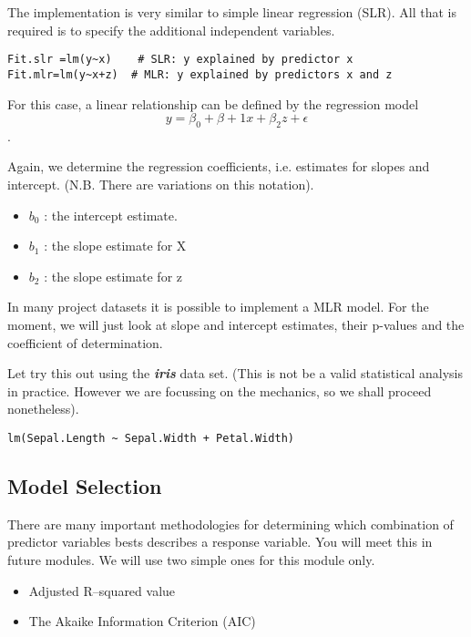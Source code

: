 \documentclass[a4paper,12pt]{article}
\begin{document}
The implementation is very similar to simple linear regression (SLR). All that is required is to specify the additional independent variables.

\begin{framed}
\begin{verbatim}
Fit.slr =lm(y~x)  	# SLR: y explained by predictor x
Fit.mlr=lm(y~x+z)  # MLR: y explained by predictors x and z
\end{verbatim}
\end{framed}

For this case, a  linear relationship can be defined by the regression model  \[y =\beta_0 + \beta+1x + \beta_2z + \epsilon\].

Again, we determine the regression coefficients, i.e. estimates for slopes and intercept. (N.B. There are variations on this notation).

\begin{itemize}
\item	$b_0$ : the intercept estimate.
\item	$b_1$  : the slope estimate for X
\item	$b_2$  : the slope estimate for z
\end{itemize}

In many project datasets it is possible to implement a MLR model. For the moment, we will just look at slope and intercept estimates, their p-values and the coefficient of determination.

Let try this out using the \textbf{\textit{iris}} data set. (This is not be a valid statistical analysis in practice. However we are focussing on the mechanics, so we shall proceed nonetheless).
\begin{framed}
\begin{verbatim}
lm(Sepal.Length ~ Sepal.Width + Petal.Width)
\end{verbatim}
\end{framed}



\subsection{Model Selection}
There are many important methodologies for determining which combination of predictor variables bests describes a response variable. You will meet this in future modules.
We will use two simple ones for this module only.
\begin{itemize}
\item Adjusted R–squared value
\item The Akaike Information Criterion (AIC)
\end{itemize}
\end{document}

